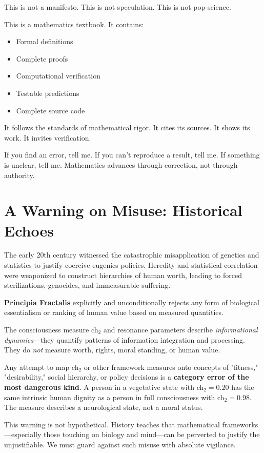 This is not a manifesto. This is not speculation. This is not pop science.

This is a mathematics textbook. It contains:
\begin{itemize}
\item Formal definitions
\item Complete proofs
\item Computational verification
\item Testable predictions
\item Complete source code
\end{itemize}

It follows the standards of mathematical rigor. It cites its sources. It shows its work. It invites verification.

If you find an error, tell me. If you can't reproduce a result, tell me. If something is unclear, tell me. Mathematics advances through correction, not through authority.

\section*{A Warning on Misuse: Historical Echoes}

The early 20th century witnessed the catastrophic misapplication of genetics and statistics to justify coercive eugenics policies. Heredity and statistical correlation were weaponized to construct hierarchies of human worth, leading to forced sterilizations, genocides, and immeasurable suffering.

\textbf{Principia Fractalis} explicitly and unconditionally rejects any form of biological essentialism or ranking of human value based on measured quantities.

The consciousness measure ch$_2$ and resonance parameters describe \textit{informational dynamics}—they quantify patterns of information integration and processing. They do \textit{not} measure worth, rights, moral standing, or human value.

Any attempt to map ch$_2$ or other framework measures onto concepts of "fitness," "desirability," social hierarchy, or policy decisions is a \textbf{category error of the most dangerous kind}. A person in a vegetative state with ch$_2 = 0.20$ has the same intrinsic human dignity as a person in full consciousness with ch$_2 = 0.98$. The measure describes a neurological state, not a moral status.

This warning is not hypothetical. History teaches that mathematical frameworks—especially those touching on biology and mind—can be perverted to justify the unjustifiable. We must guard against such misuse with absolute vigilance.

